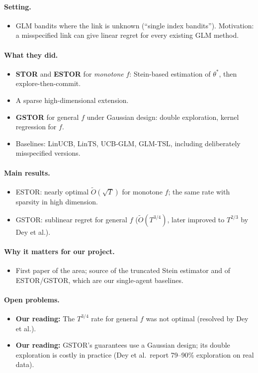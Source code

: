 \documentclass[11pt]{article}
\newcommand{\ours}{\textcolor{orange!80!black}{\textbf{Our reading:}}}
\begin{document}
\paragraph{Setting.}
\begin{itemize}\item GLM bandits where the link is unknown (``single index bandits''). Motivation: a misspecified link can give linear regret for every existing GLM method.\end{itemize}
\paragraph{What they did.}
\begin{itemize}\item \textbf{STOR} and \textbf{ESTOR} for \emph{monotone} $f$: Stein-based estimation of $\theta^*$, then explore-then-commit.\item A sparse high-dimensional extension.\item \textbf{GSTOR} for general $f$ under Gaussian design: double exploration, kernel regression for $f$.\item Baselines: LinUCB, LinTS, UCB-GLM, GLM-TSL, including deliberately misspecified versions.\end{itemize}
\paragraph{Main results.}
\begin{itemize}\item ESTOR: nearly optimal $\tilde O(\sqrt T)$ for monotone $f$; the same rate with sparsity in high dimension.\item GSTOR: sublinear regret for general $f$ ($\tilde O(T^{3/4})$, later improved to $T^{2/3}$ by Dey et al.).\end{itemize}
\paragraph{Why it matters for our project.}
\begin{itemize}\item First paper of the area; source of the truncated Stein estimator and of ESTOR/GSTOR, which are our single-agent baselines.\end{itemize}
\paragraph{Open problems.}
\begin{itemize}\item \ours{} The $T^{3/4}$ rate for general $f$ was not optimal (resolved by Dey et al.).\item \ours{} GSTOR's guarantees use a Gaussian design; its double exploration is costly in practice (Dey et al.\ report 79--90\% exploration on real data).\end{itemize}
\end{document}
